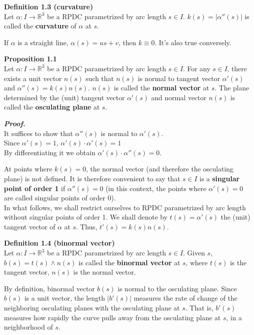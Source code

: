 \documentclass{article}
\begin{document}
\par
\textbf{Definition 1.3 (curvature)}\\
Let $\alpha: I \to \mathbb R^3$ be a RPDC parametrized by arc length $s \in I$. $k(s) = |\alpha''(s)|$ is
called the \textbf{curvature} of $\alpha$ at $s$.

\par
If $\alpha$ is a straight line, $\alpha(s) = us + v$, then $k \equiv 0$. It's also true conversely.

\par
\textbf{Proposition 1.1}\\
Let $\alpha: I \to \mathbb R^3$ be a RPDC parametrized by arc length $s \in I$. For any $s \in I$,
there exists a unit vector $n(s)$ such that $n(s)$ is normal to tangent vector $\alpha'(s)$ and
$\alpha''(s) = k(s)n(s)$. $n(s)$ is called the \textbf{normal vector} at $s$. The plane determined by the
(unit) tangent vector $\alpha'(s)$ and normal vector $n(s)$ is called the \textbf{osculating plane} at $s$.

\par
\textbf{\textit{Proof.}}\\
It suffices to show that $\alpha''(s)$ is normal to $\alpha'(s)$.\\
Since $\alpha'(s) = 1$, $\alpha'(s) \cdot \alpha'(s) = 1$\\
By differentiating it we obtain $\alpha'(s) \cdot \alpha''(s) = 0$.

\par
At points where $k(s) = 0$, the normal vector (and therefore the osculating plane) is not defined. It is
therefore convenient to say that $s \in I$ is a \textbf{singular point of order 1} if $\alpha''(s) = 0$ 
(in this context, the points where $\alpha'(s) = 0$ are called singular points of order 0).\\
In what follows, we shall restrict ourselves to RPDC parametrized by arc length without singular points
of order 1. We shall denote by $t(s) = \alpha'(s)$ the (unit) tangent vector of $\alpha$ at $s$. Thus,
$t'(s) = k(s)n(s)$.

\par
\textbf{Definition 1.4 (binormal vector)}\\
Let $\alpha: I \to \mathbb R^3$ be a RPDC parametrized by arc length $s \in I$. Given $s$, 
$b(s) = t(s) \land n(s)$ is called the \textbf{binormal vector} at $s$, where $t(s)$ is the tangent vector, 
$n(s)$ is the normal vector. 

\par
By definition, binormal vector $b(s)$ is normal to the osculating plane. Since $b(s)$ is a unit vector,
the length $|b'(s)|$ measures the rate of change of the neighboring osculating planes with the osculating
plane at $s$. That is, $b'(s)$ measures how rapidly the curve pulls away from the osculating plane at $s$,
in a neighborhood of $s$.
\end{document}
